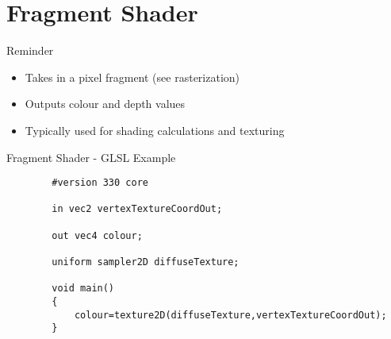 \part{Fragment Shader}
\frame{\partpage}

\begin{frame}{Reminder}
	\begin{itemize}
		\item Takes in a pixel fragment (see rasterization)
		\pause \item Outputs colour and depth values
		\pause \item Typically used for shading calculations and texturing
	\end{itemize}
\end{frame}

\begin{frame}[fragile]{Fragment Shader - GLSL Example}
	\begin{lstlisting}
		#version 330 core
		
		in vec2 vertexTextureCoordOut;
		
		out vec4 colour;
		
		uniform sampler2D diffuseTexture;
		
		void main()
		{
			colour=texture2D(diffuseTexture,vertexTextureCoordOut);
		}
	\end{lstlisting}
\end{frame}